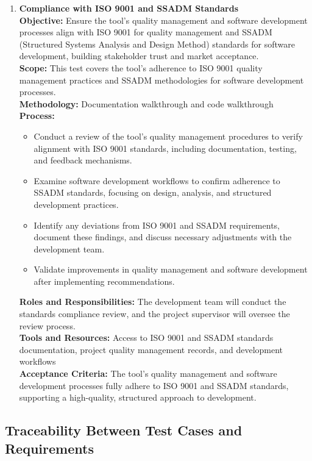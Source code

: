 \documentclass[12pt, titlepage]{article}
\begin{document}
\begin{enumerate}[label={\bf \textcolor{Maroon}{test-SRT-\arabic*}}, wide=0pt, font=\itshape]
\begin{enumerate}[label={\bf \textcolor{Maroon}{test-CPL-\arabic*}}, wide=0pt, font=\itshape]
\item \textbf{Compliance with ISO 9001 and SSADM Standards} \\[2mm]
    \textbf{Objective:} Ensure the tool’s quality management and software development processes align with ISO 9001 for quality management and SSADM (Structured Systems Analysis and Design Method) standards for software development, building stakeholder trust and market acceptance. \\[2mm]
    \textbf{Scope:} This test covers the tool’s adherence to ISO 9001 quality management practices and SSADM methodologies for software development processes. \\[2mm]
    \textbf{Methodology:} Documentation walkthrough and code walkthrough \\[2mm]
    \textbf{Process:}
    \begin{itemize}
      \item Conduct a review of the tool’s quality management procedures to verify alignment with ISO 9001 standards, including documentation, testing, and feedback mechanisms.
      \item Examine software development workflows to confirm adherence to SSADM standards, focusing on design, analysis, and structured development practices.
      \item Identify any deviations from ISO 9001 and SSADM requirements, document these findings, and discuss necessary adjustments with the development team.
      \item Validate improvements in quality management and software development after implementing recommendations.
    \end{itemize}
    \textbf{Roles and Responsibilities:} The development team will conduct the standards compliance review, and the project supervisor will oversee the review process. \\[2mm]
    \textbf{Tools and Resources:} Access to ISO 9001 and SSADM standards documentation, project quality management records, and development workflows \\[2mm]
    \textbf{Acceptance Criteria:} The tool’s quality management and software development processes fully adhere to ISO 9001 and SSADM standards, supporting a high-quality, structured approach to development.
\end{enumerate}

\subsection{Traceability Between Test Cases and Requirements} \label{trace-sys}


\end{enumerate}
\end{document}
